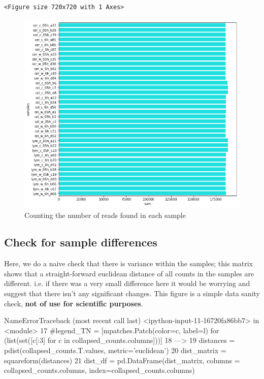 \documentclass[a4paper]{article}
\begin{document}
\begin{verbatim}
<Figure size 720x720 with 1 Axes>
\end{verbatim}

\begin{figure}[htbp]
\centering
\includegraphics[width=.9\linewidth]{obipy-resources/samplecounts.png}
\caption{\label{samplecounts}
Counting the number of reads found in each sample}
\end{figure}

\clearpage


\subsection{Check for sample differences}
\label{sec:org0f25176}
Here, we do a naive check that there is variance within the samples; this matrix shows that a straight-forward euclidean distance of all counts in the samples are different. i.e. if there was a very small difference here it would be worrying and suggest that there isn't any significant changes.
This figure is a simple data sanity check, \textbf{not of use for scientific purposes}.

NameErrorTraceback (most recent call last)
<ipython-input-11-16720fa86bb7> in <module>
     17 \#legend\_TN = [mpatches.Patch(color=c, label=l) for (list(set([c[:3] for c in collapsed\_counts.columns]))]
     18
---> 19 distances = pdist(collapsed\_counts.T.values, metric='euclidean')
     20 dist\_matrix = squareform(distances)
     21 dist\_df = pd.DataFrame(dist\_matrix, columns = collapsed\_counts.columns, index=collapsed\_counts.columns)
\end{document}
